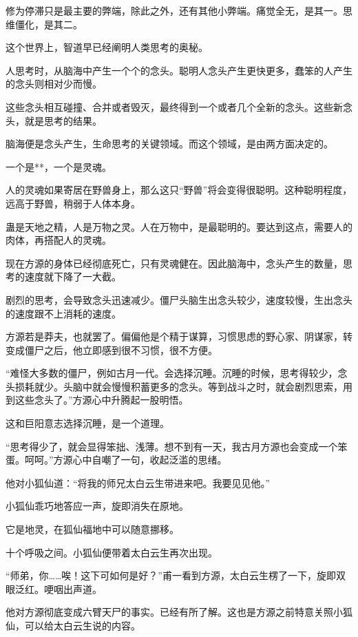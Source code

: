 
\begin{this_body}

修为停滞只是最主要的弊端，除此之外，还有其他小弊端。痛觉全无，是其一。思维僵化，是其二。

这个世界上，智道早已经阐明人类思考的奥秘。

人思考时，从脑海中产生一个个的念头。聪明人念头产生更快更多，蠢笨的人产生的念头则相对少而慢。

这些念头相互碰撞、合并或者毁灭，最终得到一个或者几个全新的念头。这些新念头，就是思考的结果。

脑海便是念头产生，生命思考的关键领域。而这个领域，是由两方面决定的。

一个是**，一个是灵魂。

人的灵魂如果寄居在野兽身上，那么这只“野兽”将会变得很聪明。这种聪明程度，远高于野兽，稍弱于人体本身。

蛊是天地之精，人是万物之灵。人在万物中，是最聪明的。要达到这点，需要人的肉体，再搭配人的灵魂。

现在方源的身体已经彻底死亡，只有灵魂健在。因此脑海中，念头产生的数量，思考的速度就下降了一大截。

剧烈的思考，会导致念头迅速减少。僵尸头脑生出念头较少，速度较慢，生出念头的速度跟不上消耗的速度。

方源若是莽夫，也就罢了。偏偏他是个精于谋算，习惯思虑的野心家、阴谋家，转变成僵尸之后，他立即感到很不习惯，很不方便。

“难怪大多数的僵尸，例如古月一代。会选择沉睡。沉睡的时候，思考得较少，念头损耗就少。头脑中就会慢慢积蓄更多的念头。等到战斗之时，就会剧烈思索，用到这些念头了。”方源心中升腾起一股明悟。

这和巨阳意志选择沉睡，是一个道理。

“思考得少了，就会显得笨拙、浅薄。想不到有一天，我古月方源也会变成一个笨蛋。呵呵。”方源心中自嘲了一句，收起泛滥的思绪。

他对小狐仙道：“将我的师兄太白云生带进来吧。我要见见他。”

小狐仙乖巧地答应一声，旋即消失在原地。

它是地灵，在狐仙福地中可以随意挪移。

十个呼吸之间。小狐仙便带着太白云生再次出现。

“师弟，你……唉！这下可如何是好？”甫一看到方源，太白云生楞了一下，旋即双眼泛红。哽咽出声道。

他对方源彻底变成六臂天尸的事实。已经有所了解。这也是方源之前特意关照小狐仙，可以给太白云生说的内容。


\end{this_body}
